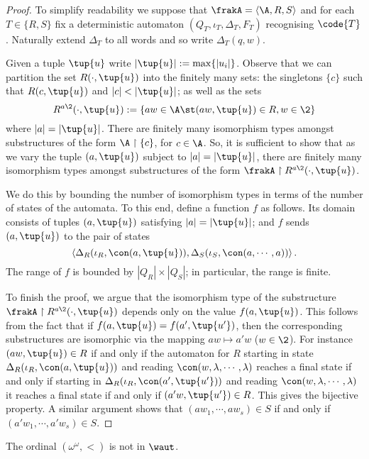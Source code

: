 \begin{proof}
To simplify readability we suppose that $\frakA = \left<\A, R, S \right>$ and for each $T \in \{R,S\}$ fix a deterministic automaton  $(Q_T,\iota_T,\Delta_T,F_T)$ recognising $\code{T}$.
Naturally extend $\Delta_T$ to all words and so write
$\Delta_T(q,w)$. 

Given a tuple $\tup{u}$ write $|\tup{u}| := \max\{|u_i|\}$. Observe that we can partition the set $R(\cdot,\tup{u})$
into the finitely many sets: the singletons $\{c\}$ such that $R(c,\tup{u})$ and  $|c| <
|\tup{u}|$; as well as the sets 
\[
R^{a \2}(\cdot,\tup{u}) := \{aw \in \A \st (aw,\tup{u}) \in R, w \in \2\}
\]
where $|a| = |\tup{u}|$. There are finitely
many isomorphism types amongst substructures of the form ${\A} \restriction
\{c\}$, for $c \in \A$. So, it is sufficient to show that as we vary the tuple
$(a,\tup{u})$ subject to $|a| = |\tup{u}|$, there are finitely many isomorphism
types amongst substructures of the form $\frakA \restriction R^{a \2}(\cdot,\tup{u})$.

We do this by bounding the number of isomorphism types in terms of the number
of states of the automata. To this end, define a function $f$ as
follows. Its domain consists of tuples $(a,\tup{u})$ satisfying $|a| = |\tup{u}|$; and $f$ sends $(a,\tup{u})$ to the pair of states
$$
\left<
\Delta_R(\iota_R,\con(a,\tup{u})),
\Delta_S(\iota_S,\con(a, \cdots, a) ) \right>.
$$
The range of $f$ is bounded by $|Q_R| \times |Q_S|$; in particular, the range is finite.

To finish the proof, we argue that the isomorphism type of the
substructure $\frakA \restriction R^{a \2}(\cdot,\tup{u})$ depends
only on the value $f(a,\tup{u})$. This follows from the fact that if
$f(a,\tup{u}) = f(a',\tup{u'})$, then the corresponding substructures
are isomorphic via the mapping $aw \mapsto a'w$ ($w \in \2$).
For instance $(aw,\tup{u}) \in R$ if and only if the automaton for $R$ starting in state
$\Delta_R(\iota_R,\con(a,\tup{u}))$ and reading $\con(w,\lambda,\cdots,\lambda)$ reaches
a final state if and only if starting in $\Delta_R(\iota_R,\con(a',\tup{u'}))$ and reading $\con(w,\lambda,\cdots,\lambda)$
it reaches a final state if and only if $(a'w,\tup{u'}) \in R$. This gives the bijective property.
A similar argument shows that $(aw_1,\cdots,aw_s) \in S$ if and only if $(a'w_1,\cdots,a'w_s) \in S$.
\end{proof}


\begin{corollary}  \label{cor:omegaomega}
The ordinal $(\omega^\omega,<)$ is not in $\waut$.
\end{corollary}

